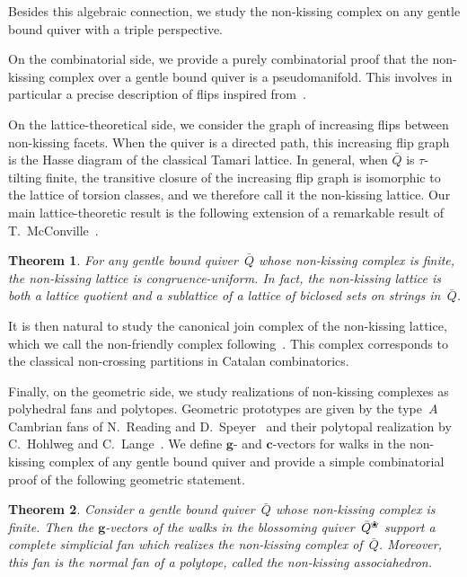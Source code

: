 \documentclass{memo-l}
\newtheorem*{theorem*}{Theorem}%
\theoremstyle{definition}
\renewcommand{\b}[1]{\mathbf{#1}} %
\newcommand{\blossom}{^\text{\ding{96}}} %
\begin{document}
Besides this algebraic connection, we study the non-kissing complex on any gentle bound quiver with a triple perspective.

On the combinatorial side, we provide a purely combinatorial proof that the non-kissing complex over a gentle bound quiver is a pseudomanifold.
This involves in particular a precise description of flips inspired from~\cite[Sect.~3]{McConville}.

On the lattice-theoretical side, we consider the graph of increasing flips between non-kissing facets.
When the quiver is a directed path, this increasing flip graph is the Hasse diagram of the classical Tamari lattice.
In general, when $\bar Q$ is \mbox{$\tau$-tilting} finite, the transitive closure of the increasing flip graph is isomorphic to the lattice of torsion classes, and we therefore call it the non-kissing lattice.
Our main lattice-theoretic result is the following extension of a remarkable result of T.~McConville~\cite{McConville}.

\begin{theorem*}
For any gentle bound quiver~$\bar Q$ whose non-kissing complex is finite, the non-kissing lattice is congruence-uniform.
In fact, the non-kissing lattice is both a lattice quotient and a sublattice of a lattice of biclosed sets on strings in~$\bar Q$.
\end{theorem*}

\noindent
It is then natural to study the canonical join complex of the non-kissing lattice, which we call the non-friendly complex following~\cite{GarverMcConville-grid}.
This complex corresponds to the classical non-crossing partitions in Catalan combinatorics.

Finally, on the geometric side, we study realizations of non-kissing complexes as polyhedral fans and polytopes.
Geometric prototypes are given by the type~$A$ Cambrian fans of N.~Reading and D.~Speyer~\cite{ReadingSpeyer} and their polytopal realization by C.~Hohlweg and C.~Lange~\cite{HohlwegLange}.
We define $\b{g}$- and $\b{c}$-vectors for walks in the non-kissing complex of any gentle bound quiver and provide a simple combinatorial proof of the following geometric statement.

\begin{theorem*}
Consider a gentle bound quiver~$\bar Q$ whose non-kissing complex is finite.
Then the \mbox{$\b{g}$-vectors} of the walks in the blossoming quiver~$\bar Q\blossom$ support a complete simplicial fan which realizes the non-kissing complex of~$\bar Q$.
Moreover, this fan is the normal fan of a polytope, called the non-kissing associahedron.
\end{theorem*}
\end{document}
